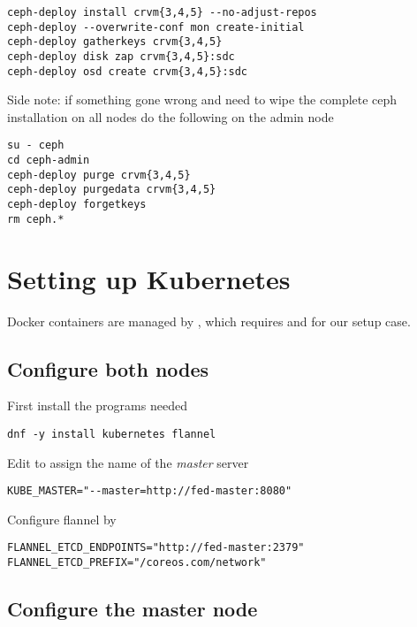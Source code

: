 \begin{lstlisting}
ceph-deploy install crvm{3,4,5} --no-adjust-repos
ceph-deploy --overwrite-conf mon create-initial
ceph-deploy gatherkeys crvm{3,4,5}
ceph-deploy disk zap crvm{3,4,5}:sdc
ceph-deploy osd create crvm{3,4,5}:sdc
\end{lstlisting}

Side note: if something gone wrong and need to wipe
the complete ceph installation on all nodes do the
following on the admin node

\begin{lstlisting}
su - ceph
cd ceph-admin
ceph-deploy purge crvm{3,4,5}
ceph-deploy purgedata crvm{3,4,5}
ceph-deploy forgetkeys
rm ceph.*
\end{lstlisting}

\section{Setting up Kubernetes}
\label{sec:setup-kuber}

Docker containers are managed by ,
which requires  and
 for our setup case.

\subsection{Configure both nodes}
\label{subsec:setup-kuber-both}

First install the programs needed

\begin{lstlisting}
dnf -y install kubernetes flannel
\end{lstlisting}

Edit  to assign the
name of the \emph{master} server

\begin{lstlisting}
KUBE_MASTER="--master=http://fed-master:8080"
\end{lstlisting}

Configure flannel by 

\begin{lstlisting}
FLANNEL_ETCD_ENDPOINTS="http://fed-master:2379"
FLANNEL_ETCD_PREFIX="/coreos.com/network"
\end{lstlisting}

\subsection{Configure the master node}
\label{subsec:setup-kuber-master}


